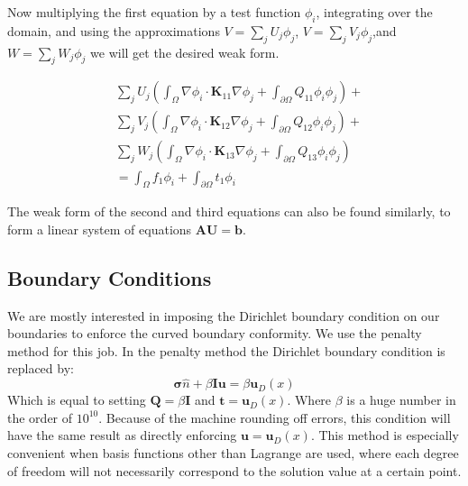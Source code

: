 \documentclass[letter,12pt]{article}
\newcommand*{\hvec}[1]{\mathbf{#1}}
\newcommand*{\hmat}[1]{\mathbf{#1}}
\begin{document}
Now multiplying the first equation by a test function $\phi_i$,
integrating over the domain, and using the approximations $V=\sum_j
U_j\phi_j$, $V=\sum_j V_j\phi_j$,and $W=\sum_j W_j\phi_j$ we will get the
desired weak form.

\begin{equation}
  \begin{aligned}
    & \sum_j U_j 
    \left( 
    \int_\Omega \nabla \phi_i \cdot \hmat{K}_{11} \nabla \phi_j +
    \int_{\partial \Omega} Q_{11} \phi_i \phi_j
    \right) +
    \\ &\sum_j  V_j
    \left( 
    \int_\Omega \nabla \phi_i \cdot \hmat{K}_{12} \nabla \phi_j +
    \int_{\partial \Omega} Q_{12} \phi_i \phi_j
    \right) +
    \\ &\sum_j  W_j
    \left( 
    \int_\Omega \nabla \phi_i \cdot \hmat{K}_{13} \nabla \phi_j +
    \int_{\partial \Omega} Q_{13} \phi_i \phi_j
    \right) 
    \\ 
    &= \int_\Omega f_1 \phi_i + 
    \int_{\partial \Omega} t_1 \phi_i
  \end{aligned}
\end{equation}

The weak form of the second and third equations can also be found
similarly, to form a linear system of equations $\hmat{A} \hvec{U} =
\hvec{b}$.

\subsection*{Boundary Conditions}

We are mostly interested in imposing the Dirichlet boundary condition
on our boundaries to enforce the curved boundary conformity. We use
the penalty method\cite{oden} for this job. In the penalty method the
Dirichlet boundary condition is replaced by:
\[
\hmat{\sigma} \hat{n} + \beta \hmat{I} \hvec{u} = \beta \hvec{u}_D(x)
\]
Which is equal to setting $\hmat{Q}=\beta \hmat{I}$ and $\hvec{t} =
\hvec{u}_D(x)$. Where $\beta$ is a huge number in the order of
$10^{10}$. Because of the machine rounding off errors, this condition
will have the same result as directly enforcing
$\hvec{u}=\hvec{u}_D(x)$. This method is especially convenient when
basis functions other than Lagrange are used, where each degree of
freedom will not necessarily correspond to the solution value at a
certain point.
\end{document}
